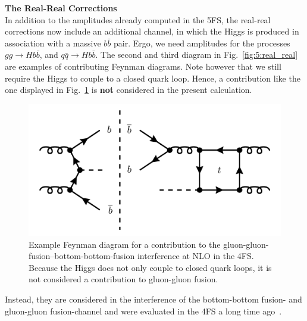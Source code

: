 \textbf{The Real-Real Corrections} \\
In addition to the amplitudes already computed in the 5\acs{FS}, the real-real corrections now include an additional channel, in which the Higgs is produced in association with a massive $b \bar{b}$ pair. Ergo, we need amplitudes for the processes $gg \longrightarrow H b \bar{b}$, and $q \bar{q} \longrightarrow H b \bar{b}$. The second and third diagram in Fig.~\ref{fig:5:real_real} are examples of contributing Feynman diagrams. Note however that we still require the Higgs to couple to a closed quark loop. Hence, a contribution like the one displayed in Fig.~\ref{fig:5:ggH_bbH_interference} is \textbf{not} considered in the present calculation.
\begin{figure}[ht]
\centering
\includegraphics[scale=0.3]{Images/NNLO_Feynman_diagrams/interference_with_bbH.pdf}
\caption{Example Feynman diagram for a contribution to the gluon-gluon-fusion--bottom-bottom-fusion interference at \acs{NLO} in the 4\acs{FS}. Because the Higgs does not only couple to closed quark loops, it is not considered a contribution to gluon-gluon fusion.}
\label{fig:5:ggH_bbH_interference}
\end{figure}
Instead, they are considered in the interference of the bottom-bottom fusion- and gluon-gluon fusion-channel and were evaluated in the 4\acs{FS} a long time ago~\cite{Dittmaier:2003ej}.


